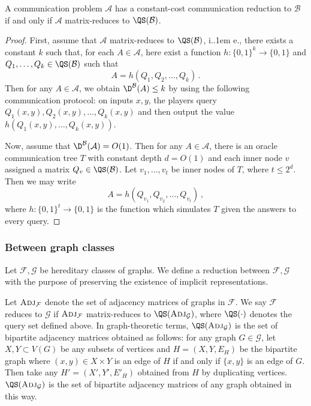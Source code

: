 \documentclass{theoretics}
\makeatletter
\newcommand{\zo}{\{0,1\}}
\newcommand{\cA}{\ensuremath{\mathcal{A}}}
\newcommand{\cB}{\ensuremath{\mathcal{B}}}
\newcommand{\cF}{\ensuremath{\mathcal{F}}}
\newcommand{\cG}{\ensuremath{\mathcal{G}}}
\newcommand{\Adj}{\textsc{Adj}}
\newcommand*\ie{i.\kern.1em e.\@\xspace} %
\makeatother
\begin{document}
\begin{proposition}\label{prop:cc-mat-red}
A communication problem $\cA$ has a constant-cost communication reduction to $\cB$ if and only if
$\cA$ matrix-reduces to $\QS(\cB)$.
\end{proposition}
\begin{proof}
First, assume that $\cA$ matrix-reduces to $\QS(\cB)$, \ie, 
there exists a constant $k$ such that, for each $A \in \cA$, 
here exist a function $h : \zo^k \to \zo$ and $Q_1, \dotsc, Q_k \in
\QS(\cB)$ such that
\[
    A = h(Q_1, Q_2, \dotsc, Q_k) \,.
\]
Then for any $A \in \cA$, we obtain $\D^\cB(A) \leq k$ by using the following communication
protocol: on
inputs $x,y$, the players query $Q_1(x,y), Q_2(x,y), \dotsc, Q_k(x,y)$ and then output the value $h(Q_1(x,y), \dotsc, Q_k(x,y))$.

Now, assume that $\D^\cB(\cA) = O(1)$. Then for any $A \in \cA$, there is an oracle communication
tree $T$ with constant depth $d = O(1)$ and each inner node $v$ assigned a matrix $Q_v \in
\QS(\cB)$. Let $v_1, \dotsc, v_t$ be inner nodes of $T$, where $t \leq 2^d$. Then we may write
\[
  A = h(Q_{v_1}, Q_{v_2}, \dotsc, Q_{v_t}) \,,
\]
where $h : \zo^t \to \zo$ is the function which simulates $T$ given the answers to every query.
\end{proof}

\subsubsection{Between graph classes}
\label{section:graph-class-reductions}

Let $\cF, \cG$ be hereditary classes of graphs. We define a reduction between $\cF, \cG$ with the
purpose of preserving the existence of implicit representations.

Let $\Adj_\cF$ denote the set of adjacency matrices of graphs in $\cF$.  We say $\cF$ reduces to
$\cG$ if $\Adj_\cF$ matrix-reduces to $\QS(\Adj_\cG)$, where $\QS(\cdot)$ denotes the query set
defined above. In graph-theoretic terms, $\QS(\Adj_\cG)$ is the set of bipartite adjacency matrices
obtained as follows: for any graph $G \in \cG$, let $X, Y \subset V(G)$ be any subsets of vertices
and $H = (X,Y,E_H)$ be the bipartite graph where $(x,y) \in X \times Y$ is an edge of $H$ if and only if 
$\{x,y\}$ is an edge of $G$. Then take any $H' = (X',Y',E'_H)$ obtained from $H$ by duplicating vertices. $\QS(\Adj_\cG)$
is the set of bipartite adjacency matrices of any graph obtained in this way.
\end{document}
